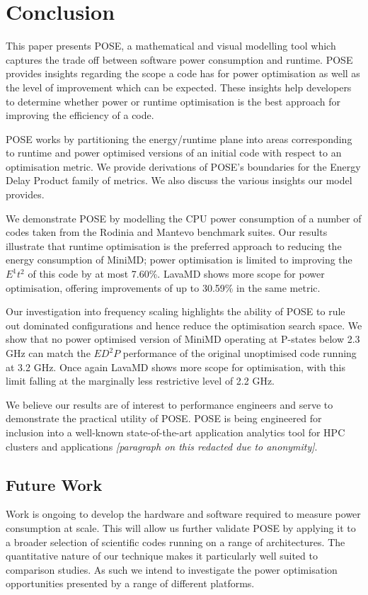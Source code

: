 \section{Conclusion}
\label{sec:conclusion}
\noindent
This paper presents POSE, a mathematical and visual modelling tool which captures the trade off between software power consumption and runtime.
POSE provides insights regarding the scope a code has for power optimisation as well as the level of improvement which can be expected.
These insights help developers to determine whether power or runtime optimisation is the best approach for improving the efficiency of a code.

POSE works by partitioning the energy/runtime plane into areas corresponding to runtime and power optimised versions of an initial code with respect to an optimisation metric.
We provide derivations of POSE's boundaries for the Energy Delay Product family of metrics.
We also discuss the various insights our model provides.

We demonstrate POSE by modelling the CPU power consumption of a number of codes taken from the Rodinia and Mantevo benchmark suites.  
Our results illustrate that runtime optimisation is the preferred approach to reducing the energy consumption of MiniMD; power optimisation is limited to improving the $E^1t^2$ of this code by at most 7.60\%.
LavaMD shows more scope for power optimisation, offering improvements of up to 30.59\% in the same metric. 

Our investigation into frequency scaling highlights the ability of POSE to rule out dominated configurations and hence reduce the optimisation search space.
We show that no power optimised version of MiniMD operating at P-states below 2.3 GHz can match the $ED^2P$ performance of the original unoptimised code running at 3.2 GHz.
Once again LavaMD shows more scope for optimisation, with this limit falling at the marginally less restrictive level of 2.2 GHz.

We believe our results are of interest to performance engineers and serve to demonstrate the practical utility of POSE.
POSE is being engineered for inclusion into a well-known state-of-the-art application analytics tool for HPC clusters and applications \textit{[paragraph on this redacted due to anonymity]}.

\subsection*{Future Work}
\noindent
Work is ongoing to develop the hardware and software required to measure power consumption at scale.
This will allow us further validate POSE by applying it to a broader selection of scientific codes running on a range of architectures.
The quantitative nature of our technique makes it particularly well suited to comparison studies.
As such we intend to investigate the power optimisation opportunities presented by a range of different platforms.

